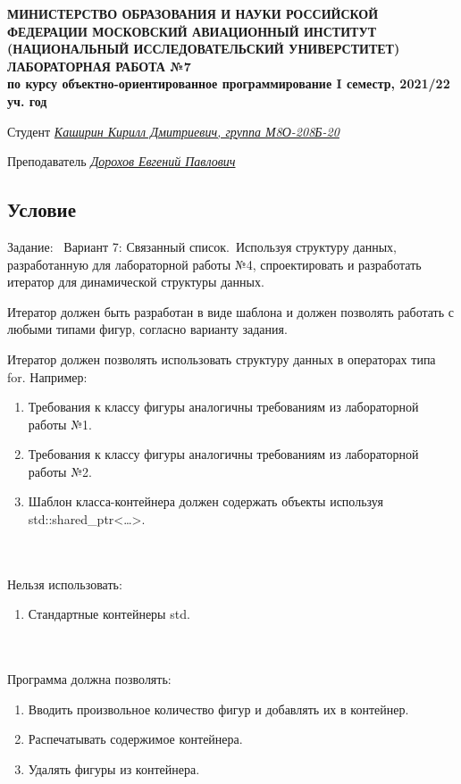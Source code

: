 \documentclass[12pt]{article}
\begin{document}
\begin{titlepage}
\begin{center}
\textbf{МИНИСТЕРСТВО ОБРАЗОВАНИЯ И НАУКИ РОССИЙСКОЙ ФЕДЕРАЦИИ
\medskip
МОСКОВСКИЙ АВИАЦИОННЫЙ ИНСТИТУТ
(НАЦИОНАЛЬНЫЙ ИССЛЕДОВАТЕЛЬСКИЙ УНИВЕРСТИТЕТ)
\vfill\vfill
{\Huge ЛАБОРАТОРНАЯ РАБОТА №7} \\
по курсу объектно-ориентированное программирование
I семестр, 2021/22 уч. год}
\end{center}
\vfill

Студент \uline{\it {Каширин Кирилл Дмитриевич, группа М8О-208Б-20}\hfill}

Преподаватель \uline{\it {Дорохов Евгений Павлович}\hfill}

\vfill
\end{titlepage}

\subsection*{Условие}

Задание: \
Вариант 7: Связанный список.\
Используя структуру данных, разработанную для лабораторной работы №4, спроектировать и разработать итератор для динамической структуры данных.

Итератор должен быть разработан в виде шаблона и должен позволять работать с любыми типами фигур, согласно варианту задания.
 
Итератор должен позволять использовать структуру данных в операторах типа for. Например:

\begin{enumerate}
\item Требования к классу фигуры аналогичны требованиям из лабораторной работы №1.
\item Требования к классу фигуры аналогичны требованиям из лабораторной работы №2.
\item Шаблон класса-контейнера должен содержать объекты используя std::shared\_ptr<…>.
\end{enumerate}
\\ \\
Нельзя использовать:
\begin{enumerate}
\item Стандартные контейнеры std.
\end{enumerate}
\\ \\
Программа должна позволять:
\begin{enumerate}
\item Вводить произвольное количество фигур и добавлять их в контейнер.
\item Распечатывать содержимое контейнера.
\item Удалять фигуры из контейнера.
\end{enumerate}
\end{document}
